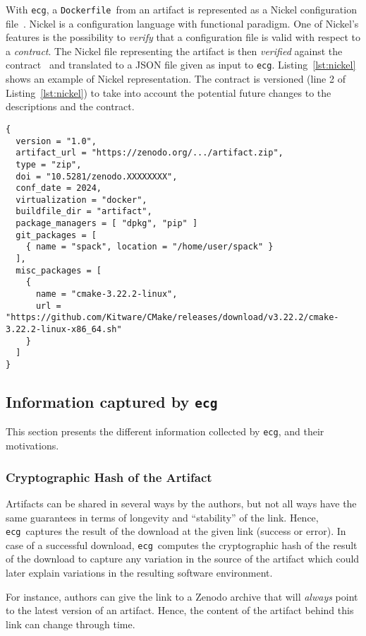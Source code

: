 \documentclass[sigconf,natbib=false]{acmart}
\newcommand{\df}{\texttt{Dockerfile}}
\newcommand{\ecg}{\texttt{ecg}}
\begin{document}
With \ecg, a \df\ from an artifact is represented as a Nickel configuration file~\cite{nickel}.
Nickel is a configuration language with functional paradigm.
One of Nickel's features is the possibility to \emph{verify} that a configuration file is valid with respect to a \emph{contract}.
The Nickel file representing the artifact is then \emph{verified} against the contract~\cite{ecg_contract} and translated to a JSON file given as input to \ecg.
Listing~\ref{lst:nickel} shows an example of Nickel representation.
The contract is versioned (line 2 of Listing~\ref{lst:nickel}) to take into account the potential future changes to the descriptions and the contract.

\begin{lstlisting}[caption=Example of Artifact Nickel representation, label=lst:nickel]
{
  version = "1.0",
  artifact_url = "https://zenodo.org/.../artifact.zip",
  type = "zip",
  doi = "10.5281/zenodo.XXXXXXXX",
  conf_date = 2024,
  virtualization = "docker",
  buildfile_dir = "artifact",
  package_managers = [ "dpkg", "pip" ]
  git_packages = [
    { name = "spack", location = "/home/user/spack" }
  ],
  misc_packages = [
    {
      name = "cmake-3.22.2-linux",
      url = "https://github.com/Kitware/CMake/releases/download/v3.22.2/cmake-3.22.2-linux-x86_64.sh"
    }
  ]
}
\end{lstlisting}


\subsection{Information captured by \ecg}\label{sec:ecg:capture}

This section presents the different information collected by \ecg, and their motivations.

\subsubsection{Cryptographic Hash of the Artifact}

Artifacts can be shared in several ways by the authors, but not all ways have the same guarantees in terms of longevity and ``stability'' of the link.
Hence, \ecg\ captures the result of the download at the given link (success or error).
In case of a successful download, \ecg\ computes the cryptographic hash of the result of the download to capture any variation in the source of the artifact which could later explain variations in the resulting software environment.

For instance, authors can give the link to a Zenodo archive that will \emph{always} point to the latest version of an artifact.
Hence, the content of the artifact behind this link can change through time.
\end{document}
